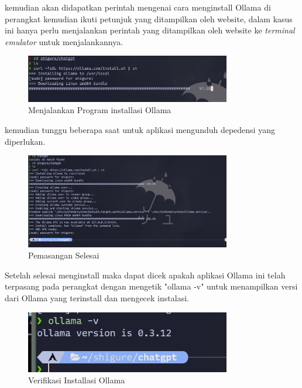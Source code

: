 \documentclass[a4paper,12pt, bahasa]{article}
\begin{document}
kemudian akan didapatkan perintah mengenai cara menginstall Ollama di perangkat kemudian ikuti petunjuk yang ditampilkan oleh website, dalam kasus ini hanya perlu menjalankan perintah yang ditampilkan oleh website ke \textit{terminal emulator} untuk menjalankannya. 

\begin{figure}[H]
  \begin{center}
    \includegraphics[width=0.80\textwidth]{images/gambar-2.png}
    \caption{Menjalankan Program installasi Ollama}
  \end{center} 
\end{figure}

  kemudian tunggu beberapa saat untuk aplikasi mengunduh depedensi yang diperlukan. 

\begin{figure}[H]
  \begin{center}
    \includegraphics[width=0.80\textwidth]{images/gambar2.png}
    \caption{Pemasangan Selesai}
  \end{center}
\end{figure}

Setelah selesai menginstall maka dapat dicek apakah aplikasi Ollama ini telah terpasang pada perangkat dengan mengetik "ollama -v" untuk menampilkan versi dari Ollama yang terinstall dan mengecek instalasi. 

\begin{figure}[H]
  \begin{center}
    \includegraphics[width=0.80\textwidth]{images/gambar3.png}
    \caption{Verifikasi Installasi Ollama}
  \end{center}
\end{figure}
\end{document}
